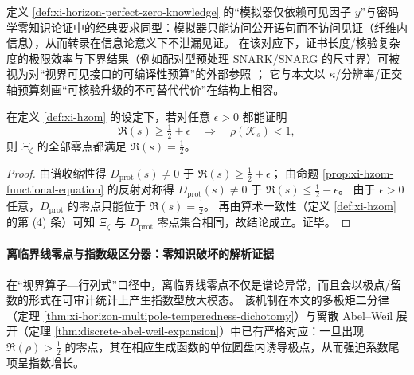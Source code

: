 \begin{remark}[与密码学零知识的抽象对齐]\label{rem:xi-hzom-crypto-alignment}
定义 \ref{def:xi-horizon-perfect-zero-knowledge} 的“模拟器仅依赖可见因子 \(y\)”与密码学零知识论证中的经典要求同型：模拟器只能访问公开语句而不访问见证（纤维内信息），从而转录在信息论意义下不泄漏见证。
在该对应下，证书长度/核验复杂度的极限效率与下界结果（例如配对型预处理 SNARK/SNARG 的尺寸界）可被视为对“视界可见接口的可编译性预算”的外部参照 \cite{Groth2016SizePairingNIZK}；
它与本文以 \(\kappa\)/分辨率/正交轴预算刻画“可核验升级的不可替代代价”在结构上相容。
\end{remark}

\begin{theorem}[HZOM 可检验收缩性模板：谱半径收缩 \texorpdfstring{$\Rightarrow$}{=>} 零点强迫临界化]\label{thm:xi-hzom-rh-reduction}
在定义 \ref{def:xi-hzom} 的设定下，若对任意 \(\epsilon>0\) 都能证明
\[
\Re(s)\ge \tfrac12+\epsilon\quad\Longrightarrow\quad \rho(\mathcal{K}_s)<1,
\]
则 \(\Xi_{\zeta}\) 的全部零点都满足 \(\Re(s)=\tfrac12\)。
\end{theorem}

\begin{proof}
由谱收缩性得 \(D_{\mathrm{prot}}(s)\neq 0\) 于 \(\Re(s)\ge \tfrac12+\epsilon\)；
由命题 \ref{prop:xi-hzom-functional-equation} 的反射对称得 \(D_{\mathrm{prot}}(s)\neq 0\) 于 \(\Re(s)\le \tfrac12-\epsilon\)。
由于 \(\epsilon>0\) 任意，\(D_{\mathrm{prot}}\) 的零点只能位于 \(\Re(s)=\tfrac12\)。
再由算术一致性（定义 \ref{def:xi-hzom} 的第 (4) 条）可知 \(\Xi_{\zeta}\) 与 \(D_{\mathrm{prot}}\) 零点集合相同，故结论成立。证毕。
\end{proof}

\paragraph{离临界线零点与指数级区分器：零知识破坏的解析证据}
在“视界算子—行列式”口径中，离临界线零点不仅是谱论异常，而且会以极点/留数的形式在可审计统计上产生指数型放大模态。
该机制在本文的多极矩二分律（定理 \ref{thm:xi-horizon-multipole-temperedness-dichotomy}）与离散 Abel--Weil 展开（定理 \ref{thm:discrete-abel-weil-expansion}）中已有严格对应：一旦出现 \(\Re(\rho)>\tfrac12\) 的零点，其在相应生成函数的单位圆盘内诱导极点，从而强迫系数尾项呈指数增长。

